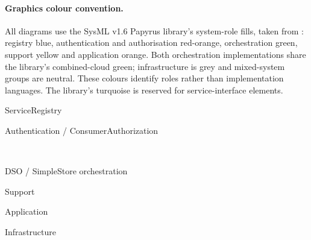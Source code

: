 \paragraph{Graphics colour convention.}
All diagrams use the SysML v1.6 Papyrus library's system-role fills, taken from
: registry blue, authentication
and authorisation red-orange, orchestration green, support yellow and application
orange. Both orchestration implementations share the library's combined-cloud
green; infrastructure is grey and mixed-system groups are neutral. These colours
identify roles rather than implementation languages. The library's turquoise is
reserved for service-interface elements.
\begin{center}\scriptsize
\setlength{\fboxsep}{4pt}
\colorbox{AHSysMLRegistry}{\strut ServiceRegistry}\quad
\colorbox{AHSysMLSecurity}{\strut Authentication / ConsumerAuthorization}\\[6pt]
\colorbox{AHSysMLOrchestration}{\strut DSO / SimpleStore orchestration}\quad
\colorbox{AHSysMLSupport}{\strut Support}\quad
\colorbox{AHSysMLApplication}{\strut Application}\quad
\colorbox{AHSysMLInfrastructure}{\strut Infrastructure}
\end{center}
